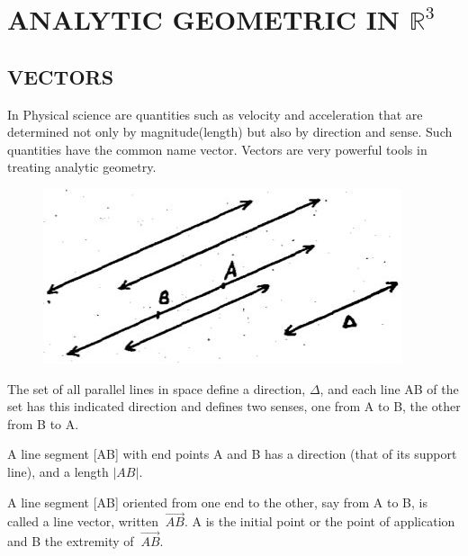 \documentclass[11pt]{amsbook}
\begin{document}
\chapter{ANALYTIC GEOMETRIC IN $\mathbb{R}^3$}
\section{VECTORS}


\begin{defn}
In Physical science are quantities such as velocity and acceleration that are determined not only by magnitude(length) but also by direction and sense. Such quantities have the common name vector. Vectors are very powerful tools in treating analytic geometry.
\end{defn}

\begin{figure}
\includegraphics[width=\linewidth]{images/11}
\end{figure}

The set of all parallel lines in space define a direction, ${\Delta}$, and each line AB of the set has this indicated direction and defines two senses, one from A to B, the other from B to A.

A line segment [AB] with end points A and B has a direction (that of its support line), and a length $|AB|$.

A line segment [AB] oriented from one end to the other, say from A to B, is called a line vector, written $\ \overrightarrow{AB}$. A is the initial point or the point of application and B the extremity of $\ \overrightarrow{AB}$.
\end{document}
